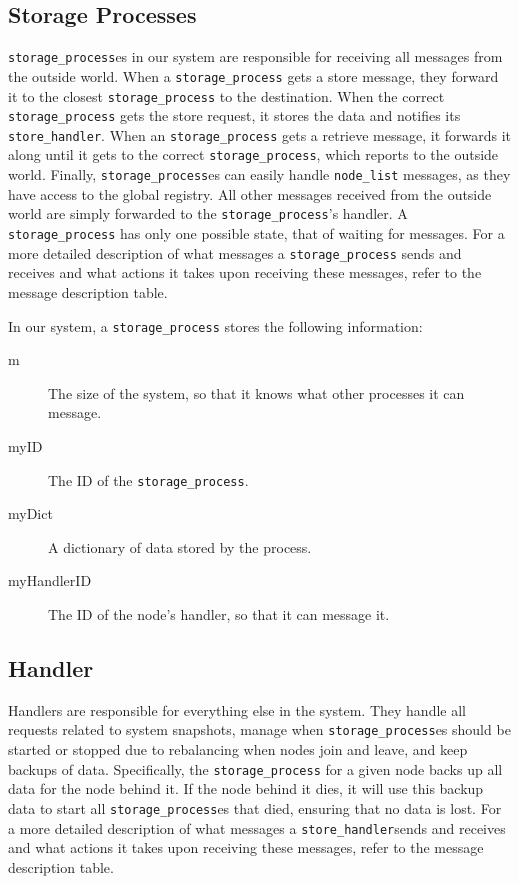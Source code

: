 \documentclass[12pt,letterpaper]{article}
\renewcommand{\tt}[1]{\texttt{#1}}
\newcommand{\sh}{\tt{store\_handler}}
\renewcommand{\sp}{\tt{storage\_process}}
\begin{document}
\subsection*{Storage Processes}

\sp es in our system are responsible for receiving all messages from the outside world. When a \sp{} gets a store message, they forward it to the closest \sp{} to the destination. When the correct \sp{} gets the store request, it stores the data and notifies its \sh. When an \sp{} gets a retrieve message, it forwards it along until it gets to the correct \sp, which reports to the outside world. Finally, \sp es can easily handle \tt{node\_list} messages, as they have access to the global registry. All other messages received from the outside world are simply forwarded to the \sp 's handler. A \sp{} has only one possible state, that of waiting for messages. For a more detailed description of what messages a \sp{} sends and receives and what actions it takes upon receiving these messages, refer to the message description table.

In our system, a \sp{} stores the following information:
\begin{description}
\item [m] The size of the system, so that it knows what other processes it can message.
\item [myID] The ID of the \sp.
\item [myDict] A dictionary of data stored by the process.
\item [myHandlerID] The ID of the node's handler, so that it can message it.
\end{description}

\subsection*{Handler}

Handlers are responsible for everything else in the system. They handle all requests related to system snapshots, manage when \sp es should be started or stopped due to rebalancing when nodes join and leave, and keep backups of data. Specifically, the \sp{} for a given node backs up all data for the node behind it. If the node behind it dies, it will use this backup data to start all \sp es that died, ensuring that no data is lost. For a more detailed description of what messages a \sh sends and receives and what actions it takes upon receiving these messages, refer to the message description table.
\end{document}
